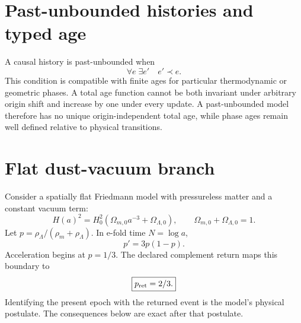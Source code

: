 \documentclass[11pt,a4paper]{article}
\begin{document}
\MakeResearchTitle
\MakeResearchContents
{}
\section{Past-unbounded histories and typed age}
A causal history is past-unbounded when
\begin{equation}
\forall e\;\exists e'\quad e'\prec e.
\end{equation}
This condition is compatible with finite ages for particular thermodynamic or geometric phases. A total age function cannot be both invariant under arbitrary origin shift and increase by one under every update. A past-unbounded model therefore has no unique origin-independent total age, while phase ages remain well defined relative to physical transitions.

\section{Flat dust-vacuum branch}
Consider a spatially flat Friedmann model with pressureless matter and a constant vacuum term:
\begin{equation}
H(a)^2=H_0^2\left(\Omega_{m,0}a^{-3}+\Omega_{\Lambda,0}\right),
\qquad \Omega_{m,0}+\Omega_{\Lambda,0}=1.
\end{equation}
Let $p=\rho_\Lambda/(\rho_m+\rho_\Lambda)$. In e-fold time $N=\log a$,
\begin{equation}
p'=3p(1-p).
\end{equation}
Acceleration begins at $p=1/3$. The declared complement return maps this boundary to
\begin{equation}
\boxed{p_{\rm ret}=2/3.}
\end{equation}
Identifying the present epoch with the returned event is the model's physical postulate. The consequences below are exact after that postulate.
\end{document}
